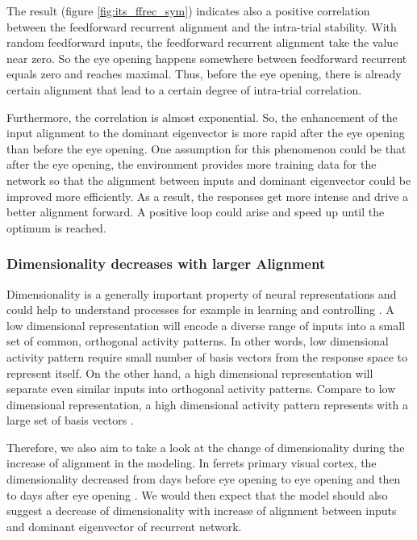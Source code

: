 \documentclass[11pt]{article}
\begin{document}
	The result (figure \ref{fig:its_ffrec_sym}) indicates also a positive correlation between the feedforward recurrent alignment and the intra-trial stability. With random feedforward inputs, the feedforward recurrent alignment take the value near zero. So the eye opening happens somewhere between feedforward recurrent equals zero and reaches maximal. Thus, before the eye opening, there is already certain alignment that lead to a certain degree of intra-trial correlation. 
	
	Furthermore, the correlation is almost exponential. So, the enhancement of the input alignment to the dominant eigenvector is more rapid after the eye opening than before the eye opening. One assumption for this phenomenon could be that after the eye opening, the environment provides more training data for the network so that the alignment between inputs and dominant eigenvector could be improved more efficiently. As a result, the responses get more intense and drive a better alignment forward. A positive loop could arise and speed up until the optimum is reached. 
	
	\subsubsection{Dimensionality decreases with larger Alignment}
	
	Dimensionality is a generally important property of neural representations and could help to understand processes for example in learning and controlling \cite{bartolo2020dimensionality, badre2021dimensionality}. A low dimensional representation will encode a diverse range of inputs into a small set of common, orthogonal activity patterns. In other words, low dimensional activity pattern require small number of basis vectors from the response space to represent itself. On the other hand, a high dimensional representation will separate even similar inputs into orthogonal activity patterns. Compare to low dimensional representation, a high dimensional activity pattern represents with a large set of basis vectors \cite{badre2021dimensionality}. 
	
	Therefore, we also aim to take a look at the change of dimensionality during the increase of alignment in the modeling. In ferrets primary visual cortex, the dimensionality decreased from days before eye opening to eye opening and then to days after eye opening \cite{tragenap2023nature}. We would then expect that the model should also suggest a decrease of dimensionality with increase of alignment between inputs and dominant eigenvector of recurrent network. 
	
\end{document}
